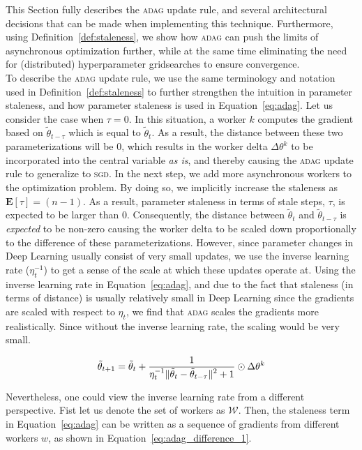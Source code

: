 This Section fully describes the \textsc{adag} update rule, and several architectural decisions that can be made when implementing this technique. Furthermore, using Definition~\ref{def:staleness}, we show how \textsc{adag} can push the limits of asynchronous optimization further, while at the same time eliminating the need for (distributed) hyperparameter gridsearches to ensure convergence.\\

To describe the \textsc{adag} update rule, we use the same terminology and notation used in Definition~\ref{def:staleness} to further strengthen the intuition in parameter staleness, and how parameter staleness is used in Equation~\ref{eq:adag}. Let us consider the case when $\tau = 0$. In this situation, a worker $k$ computes the gradient based on $\tilde{\theta}_{t-\tau}$ which is equal to $\tilde{\theta}_t$. As a result, the distance between these two parameterizations will be 0, which results in the worker delta $\Delta\theta^k$ to be incorporated into the central variable \emph{as is}, and thereby causing the \textsc{adag} update rule to generalize to \textsc{sgd}. In the next step, we add more asynchronous workers to the optimization problem. By doing so, we implicitly increase the staleness as $\mathbf{E}[\tau] = (n - 1)$. As a result, parameter staleness in terms of stale steps, $\tau$, is expected to be larger than 0. Consequently, the distance between $\tilde{\theta}_t$ and $\tilde{\theta}_{t - \tau}$ is \emph{expected} to be non-zero causing the worker delta to be scaled down proportionally to the difference of these parameterizations. However, since parameter changes in Deep Learning usually consist of very small updates, we use the inverse learning rate ($\eta_t^{-1}$) to get a sense of the scale at which these updates operate at. Using the inverse learning rate in Equation~\ref{eq:adag}, and due to the fact that staleness (in terms of distance) is usually relatively small in Deep Learning since the gradients are scaled with respect to $\eta_t$, we find that \textsc{adag} scales the gradients more realistically. Since without the inverse learning rate, the scaling would be very small.

\begin{equation}
  \label{eq:adag}
  \tilde{\theta}_{t+1} = \tilde{\theta}_t + \frac{\displaystyle 1}{\displaystyle \eta_t^{-1}\|\tilde{\theta}_t - \tilde{\theta}_{t - \tau}\|^2 + 1} \odot \Delta\theta^k
\end{equation}

Nevertheless, one could view the inverse learning rate from a different perspective. Fist let us denote the set of workers as $\mathcal{W}$. Then, the staleness term in Equation~\ref{eq:adag} can be written as a sequence of gradients from different workers $w$, as shown in Equation~\ref{eq:adag_difference_1}.

